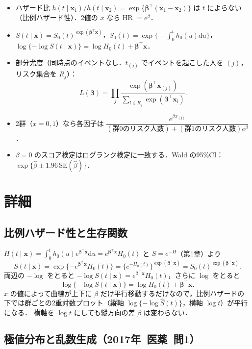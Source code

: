 \documentclass[a4paper,11pt,openany]{ltjsbook}
\newcommand{\kakomon}[2]{\mbox{#1年 医薬 問#2}}
\newcommand{\SE}{\mathrm{SE}}
\newcommand{\dd}{\mathrm{d}}
\newcommand{\transp}{^{\top}}
\begin{document}
\begin{pointbox}[覚える式]
\begin{itemize}
\item ハザード比 $h(t\mid\bm x_1)/h(t\mid\bm x_2)=\exp\{\bm\beta\transp(\bm x_1-\bm x_2)\}$ は $t$ によらない（比例ハザード性）．2値の $x$ なら HR $=e^\beta$．
\item $S(t\mid\bm x)=S_0(t)^{\exp(\bm\beta\transp\bm x)}$，\quad $S_0(t)=\exp\bigl\{-\int_0^th_0(u)\dd u\bigr\}$，\quad
      $\log\{-\log S(t\mid\bm x)\}=\log H_0(t)+\bm\beta\transp\bm x$．
\item 部分尤度（同時点のイベントなし．$t_{(j)}$ でイベントを起こした人を $(j)$，リスク集合を $R_j$）：
\[
L(\bm\beta)=\prod_{j}\frac{\exp(\bm\beta\transp\bm x_{(j)})}{\sum_{l\in R_j}\exp(\bm\beta\transp\bm x_l)} .
\]
\item 2群（$x=0,1$）なら各因子は $\dfrac{e^{\beta x_{(j)}}}{(\text{群0のリスク人数})+(\text{群1のリスク人数})e^\beta}$．
\item $\beta=0$ のスコア検定はログランク検定に一致する．Wald の95\%CI：$\exp\{\hat\beta\pm1.96\,\SE(\hat\beta)\}$．
\end{itemize}
\end{pointbox}

\section{詳細}\label{sec:m03-shosai}
\subsection{比例ハザード性と生存関数}
$H(t\mid\bm x)=\int_0^th_0(u)e^{\bm\beta\transp\bm x}\dd u=e^{\bm\beta\transp\bm x}H_0(t)$ と $S=e^{-H}$（第1章）より
\[
S(t\mid\bm x)=\exp\{-e^{\bm\beta\transp\bm x}H_0(t)\}=\bigl\{e^{-H_0(t)}\bigr\}^{\exp(\bm\beta\transp\bm x)}=S_0(t)^{\exp(\bm\beta\transp\bm x)} .
\]
両辺の $-\log$ をとると $-\log S(t\mid\bm x)=e^{\bm\beta\transp\bm x}H_0(t)$，さらに $\log$ をとると
\[
\log\{-\log S(t\mid\bm x)\}=\log H_0(t)+\bm\beta\transp\bm x .
\]
$x$ の値によって曲線が上下に $\beta$ だけ平行移動するだけなので，比例ハザードの下では群ごとの2重対数プロット（縦軸 $\log\{-\log\hat S(t)\}$，横軸 $\log t$）が平行になる．
横軸を $\log t$ にしても縦方向の差 $\beta$ は変わらない．

\subsection{極値分布と乱数生成（\kakomon{2017}{1}）}
\end{document}
